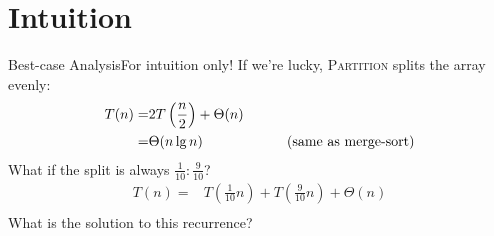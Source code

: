\documentclass{beamer}
\begin{document}
\section{Intuition}

\begin{frame}{Best-case Analysis}{For intuition only!}
    If we're lucky, \textsc{Partition} splits the array evenly:
    \begin{equation*}
        \begin{split}
            T(n) =& 2T\left(\frac{n}{2}\right) + \Theta(n) \\
                 =& \Theta(n \lg n) \text{\hspace{20mm} (same as merge-sort)} \\
        \end{split}
    \end{equation*}
    What if the split is always $\frac{1}{10}:\frac{9}{10}$?
    \begin{equation*}
        \begin{split}
            T(n) =& T\left(\frac{1}{10} n \right) + T\left(\frac{9}{10} n \right) + \Theta(n) \\
        \end{split}
    \end{equation*}
    What is the solution to this recurrence?
\end{frame}
\end{document}
